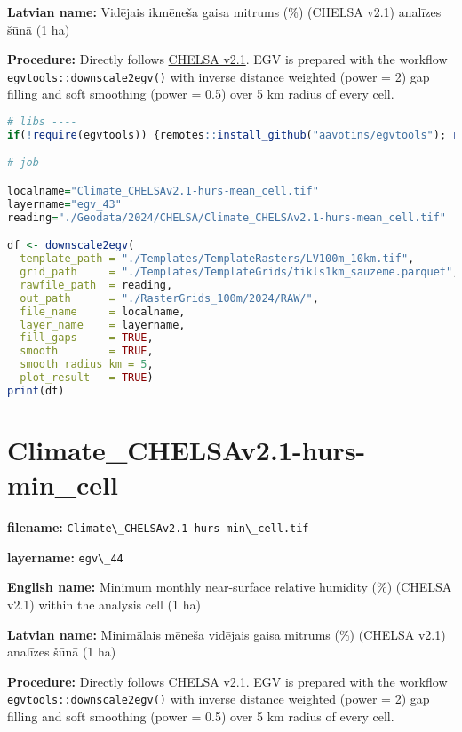 \documentclass[
]{book}
\newcommand{\passthrough}[1]{#1}
\begin{document}
\textbf{Latvian name:} Vidējais ikmēneša gaisa mitrums (\%) (CHELSA v2.1) analīzes šūnā (1 ha)

\textbf{Procedure:} Directly follows \hyperref[Ch04.11]{CHELSA v2.1}. EGV is prepared with the
workflow \passthrough{\lstinline!egvtools::downscale2egv()!} with inverse distance weighted (power = 2)
gap filling and soft smoothing (power = 0.5) over 5 km radius of every cell.

\begin{lstlisting}[language=R]
# libs ----
if(!require(egvtools)) {remotes::install_github("aavotins/egvtools"); require(egvtools)}

# job ----

localname="Climate_CHELSAv2.1-hurs-mean_cell.tif"
layername="egv_43"
reading="./Geodata/2024/CHELSA/Climate_CHELSAv2.1-hurs-mean_cell.tif"

df <- downscale2egv(
  template_path = "./Templates/TemplateRasters/LV100m_10km.tif",
  grid_path     = "./Templates/TemplateGrids/tikls1km_sauzeme.parquet",
  rawfile_path  = reading,
  out_path      = "./RasterGrids_100m/2024/RAW/",
  file_name     = localname,
  layer_name    = layername,
  fill_gaps     = TRUE,
  smooth        = TRUE,
  smooth_radius_km = 5,
  plot_result   = TRUE)
print(df)
\end{lstlisting}

\section{Climate\_CHELSAv2.1-hurs-min\_cell}\label{ch06.044}

\textbf{filename:} \passthrough{\lstinline!Climate\_CHELSAv2.1-hurs-min\_cell.tif!}

\textbf{layername:} \passthrough{\lstinline!egv\_44!}

\textbf{English name:} Minimum monthly near-surface relative humidity (\%) (CHELSA v2.1) within the analysis cell (1 ha)

\textbf{Latvian name:} Minimālais mēneša vidējais gaisa mitrums (\%) (CHELSA v2.1) analīzes šūnā (1 ha)

\textbf{Procedure:} Directly follows \hyperref[Ch04.11]{CHELSA v2.1}. EGV is prepared with the
workflow \passthrough{\lstinline!egvtools::downscale2egv()!} with inverse distance weighted (power = 2)
gap filling and soft smoothing (power = 0.5) over 5 km radius of every cell.
\end{document}
